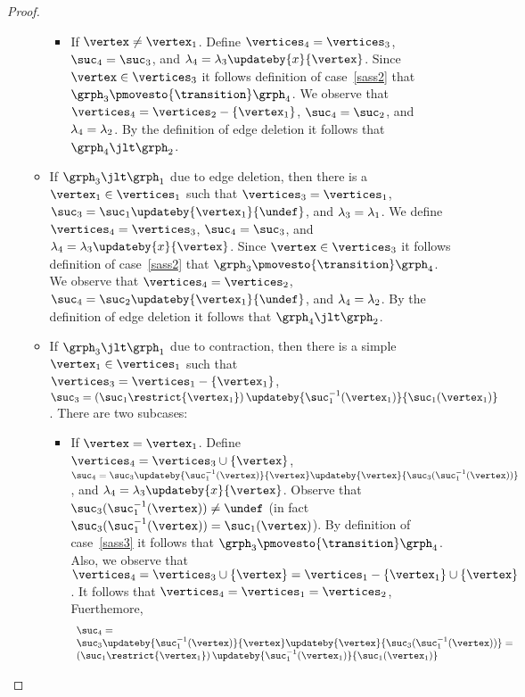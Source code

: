 \begin{proof}
\begin{itemize}
\begin{itemize}
\begin{itemize}
\item
If $\vertex\neq\vertex_1$.
%
Define
$\vertices_4=\vertices_3$,
$\suc_4=\suc_3$, and $\labeling_4=\labeling_3\updateby{\xvar}{\vertex}$.
%
Since $\vertex\in\vertices_3$ it follows definition of case~\ref{sass2} that
$\grph_3\pmovesto{\transition}\grph_4$.
%
We observe that 
$\vertices_4=\vertices_2-\set{\vertex_1}$, 
$\suc_4=\suc_2$, and $\lambda_4=\lambda_2$.
%
By the definition of edge deletion it follows that
$\grph_4\jlt\grph_2$.
\end{itemize}
\item
If $\grph_3\jlt\grph_1$ due to edge deletion, then
there is a $\vertex_1\in\vertices_1$ such that
$\vertices_3=\vertices_1$, $\suc_3=\suc_1\updateby{\vertex_1}{\undef}$,
and $\lambda_3=\lambda_1$.
%
We define
$\vertices_4=\vertices_3$,
$\suc_4=\suc_3$, and $\labeling_4=\labeling_3\updateby{\xvar}{\vertex}$.
%
Since $\vertex\in\vertices_3$ it follows definition of case~\ref{sass2} that
$\grph_3\pmovesto{\transition}\grph_4$.
%
We observe that
$\vertices_4=\vertices_2$, $\suc_4=\suc_2\updateby{\vertex_1}{\undef}$,
and $\lambda_4=\lambda_2$.
%
By the definition of edge deletion it follows that
$\grph_4\jlt\grph_2$.
\item
If $\grph_3\jlt\grph_1$ due to contraction, then
there is a simple  $\vertex_1\in\vertices_1$ such that
$\vertices_3=\vertices_1-\set{\vertex_1}$,
$\suc_3=\left(\suc_1\restrict{\vertex_1}\right)\updateby{\suc_1^{-1}(\vertex_1)}{\suc_1(\vertex_1)}$.
%
There are two subcases:
\begin{itemize}
\item
If $\vertex=\vertex_1$.
%
Define $\vertices_4=\vertices_3\cup\set{\vertex}$,
$\suc_4=\suc_3\updateby{\suc_1^{-1}(\vertex)}{\vertex}\updateby{\vertex}{\suc_3(\suc_1^{-1}(\vertex))}$,
and
$\labeling_4=\labeling_3\updateby{\xvar}{\vertex}$.
%
Observe that $\suc_3(\suc_1^{-1}(\vertex))\neq\undef$ 
(in fact $\suc_3(\suc_1^{-1}(\vertex))=\suc_1(\vertex)$).
%
By definition of case~\ref{sass3} it follows that
$\grph_3\pmovesto{\transition}\grph_4$.
%
Also, we observe that 
$\vertices_4=\vertices_3\cup\set{\vertex}
=
\vertices_1-\set{\vertex_1}\cup\set{\vertex}
$.
%
It follows that 
$\vertices_4=\vertices_1=\vertices_2$,
%
Fuerthemore,
\[
\begin{array}{l}
\suc_4=\\
\suc_3\updateby{\suc_1^{-1}(\vertex)}{\vertex}\updateby{\vertex}{\suc_3(\suc_1^{-1}(\vertex))}
=\\
\left(\suc_1\restrict{\vertex_1}\right)\updateby{\suc_1^{-1}(\vertex_1)}{\suc_1(\vertex_1)}

\end{array}\]
\end{itemize}
\end{itemize}
\end{itemize}
\end{proof}
